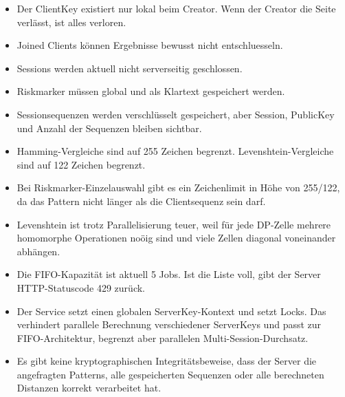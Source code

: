 \begin{itemize}
\item
  Der ClientKey existiert nur lokal beim Creator. Wenn der Creator die
  Seite verlässt, ist alles verloren.
\item
  Joined Clients können Ergebnisse bewusst nicht entschluesseln. 
\item
  Sessions werden aktuell nicht serverseitig geschlossen.
\item
  Riskmarker müssen global und als Klartext gespeichert werden.
\item
  Sessionsequenzen werden verschlüsselt gespeichert, aber Session, PublicKey und Anzahl der Sequenzen bleiben sichtbar.
\item
  Hamming-Vergleiche sind auf 255 Zeichen begrenzt.
  Levenshtein-Vergleiche sind auf 122 Zeichen begrenzt.
\item
  Bei Riskmarker-Einzelauswahl gibt es ein Zeichenlimit in Höhe von 255/122, da das Pattern nicht länger als die Clientsequenz sein darf.
\item
  Levenshtein ist trotz Parallelisierung teuer, weil für jede DP-Zelle
  mehrere homomorphe Operationen noöig sind und viele Zellen diagonal
  voneinander abhängen.
\item
  Die FIFO-Kapazität ist aktuell 5 Jobs. Ist die Liste voll, gibt der
  Server HTTP-Statuscode 429 zurück.
\item
  Der Service setzt einen globalen ServerKey-Kontext und setzt Locks. Das verhindert parallele Berechnung verschiedener
  ServerKeys und passt zur FIFO-Architektur, begrenzt aber parallelen
  Multi-Session-Durchsatz.
\item
  Es gibt keine kryptographischen Integritätsbeweise, dass der Server die angefragten Patterns, alle gespeicherten Sequenzen oder alle
  berechneten Distanzen korrekt verarbeitet hat.
\end{itemize}
